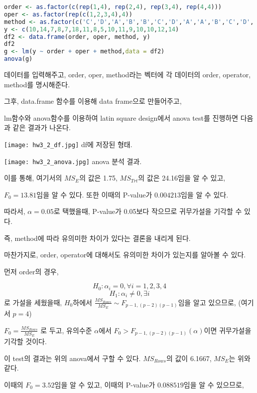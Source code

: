 \documentclass{article}
\begin{document}
\begin{lstlisting}[language=R]
order <- as.factor(c(rep(1,4), rep(2,4), rep(3,4), rep(4,4)))
oper <- as.factor(rep(c(1,2,3,4),4))
method <- as.factor(c('C','D','A','B','B','C','D','A','A','B','C','D','D','A','B','C'))
y <- c(10,14,7,8,7,18,11,8,5,10,11,9,10,10,12,14)
df2 <- data.frame(order, oper, method, y)
df2
g <- lm(y ~ order + oper + method,data = df2) 
anova(g)
\end{lstlisting}

데이터를 입력해주고, order, oper, method라는 벡터에 각 데이터의 order, operator, method를 명시해준다.

그후, data.frame 함수를 이용해 data frame으로 만들어주고, 

lm함수와 anova함수를 이용하여 latin square design에서 anova test를 진행하면 다음과 같은 결과가 나온다.

\begin{center}
    \texttt{[image: hw3\_2\_df.jpg]}
df에 저장된 형태.
\end{center} 

\begin{center}
    \texttt{[image: hw3\_2\_anova.jpg]}
anova 분석 결과.
\end{center} 

이를 통해, 여기서의 $MS_E$의 값은 1.75, $MS_{Trt}$의 값은 24.16임을 알 수 있고,

$F_0 = 13.81$임을 알 수 있다. 또한 이때의 P-value가  $0.004213$임을 알 수 있다.

따라서, $\alpha = 0.05$로 택했을때, P-value가 0.05보다 작으므로 귀무가설을 기각할 수 있다.

즉, method에 따라 유의미한 차이가 있다는 결론을 내리게 된다.

마찬가지로, order, operator에 대해서도 유의미한 차이가 있는지를 알아볼 수 있다.

먼저 order의 경우,

$$H_0 : \alpha_i = 0 , \forall i = 1, 2, 3, 4$$ 
$$H_1 :  \alpha_i \neq 0, \exists i$$
로 가설을 세웠을때, $H_0$하에서 $\frac{MS_{Rows}}{MS_E} \sim F_{p-1, (p-2)(p-1)} $임을 알고 있으므로,
(여기서 $p = 4$)

$F_0 = \frac{MS_{Rows}}{MS_E}$ 로 두고,  유의수준 $\alpha$에서 $F_0 > F_{p-1, (p-2)(p-1)}(\alpha)$이면 귀무가설을 기각할 것이다.
 
이 test의 결과는 위의 anova에서 구할 수 있다. $MS_{Rows}$의 값이 6.1667, $MS_E$는 위와 같다.

이때의 $F_0 = 3.52$임을 알 수 있고, 이때의 P-value가 $0.088519$임을 알 수 있으므로,
\end{document}
